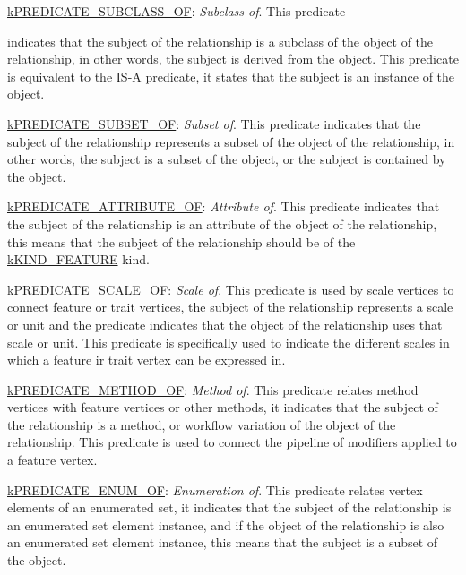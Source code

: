 \begin{DoxyItemize}
\item {\ttfamily \hyperlink{}{k\-P\-R\-E\-D\-I\-C\-A\-T\-E\-\_\-\-S\-U\-B\-C\-L\-A\-S\-S\-\_\-\-O\-F}}\-: {\itshape Subclass of}. This predicate
\begin{DoxyItemize}
\item indicates that the subject of the relationship is a subclass of the object of the relationship, in other words, the subject is derived from the object. This predicate is equivalent to the {\ttfamily I\-S-\/\-A} predicate, it states that the subject is an instance of the object. 
\end{DoxyItemize}
\item {\ttfamily \hyperlink{}{k\-P\-R\-E\-D\-I\-C\-A\-T\-E\-\_\-\-S\-U\-B\-S\-E\-T\-\_\-\-O\-F}}\-: {\itshape Subset of}. This predicate indicates that the subject of the relationship represents a subset of the object of the relationship, in other words, the subject is a subset of the object, or the subject is contained by the object. 
\item {\ttfamily \hyperlink{}{k\-P\-R\-E\-D\-I\-C\-A\-T\-E\-\_\-\-A\-T\-T\-R\-I\-B\-U\-T\-E\-\_\-\-O\-F}}\-: {\itshape Attribute of}. This predicate indicates that the subject of the relationship is an attribute of the object of the relationship, this means that the subject of the relationship should be of the \hyperlink{}{k\-K\-I\-N\-D\-\_\-\-F\-E\-A\-T\-U\-R\-E} kind. 
\item {\ttfamily \hyperlink{}{k\-P\-R\-E\-D\-I\-C\-A\-T\-E\-\_\-\-S\-C\-A\-L\-E\-\_\-\-O\-F}}\-: {\itshape Scale of}. This predicate is used by scale vertices to connect feature or trait vertices, the subject of the relationship represents a scale or unit and the predicate indicates that the object of the relationship uses that scale or unit. This predicate is specifically used to indicate the different scales in which a feature ir trait vertex can be expressed in. 
\item {\ttfamily \hyperlink{}{k\-P\-R\-E\-D\-I\-C\-A\-T\-E\-\_\-\-M\-E\-T\-H\-O\-D\-\_\-\-O\-F}}\-: {\itshape Method of}. This predicate relates method vertices with feature vertices or other methods, it indicates that the subject of the relationship is a method, or workflow variation of the object of the relationship. This predicate is used to connect the pipeline of modifiers applied to a feature vertex. 
\item {\ttfamily \hyperlink{}{k\-P\-R\-E\-D\-I\-C\-A\-T\-E\-\_\-\-E\-N\-U\-M\-\_\-\-O\-F}}\-: {\itshape Enumeration of}. This predicate relates vertex elements of an enumerated set, it indicates that the subject of the relationship is an enumerated set element instance, and if the object of the relationship is also an enumerated set element instance, this means that the subject is a subset of the object. 

\end{DoxyItemize}
